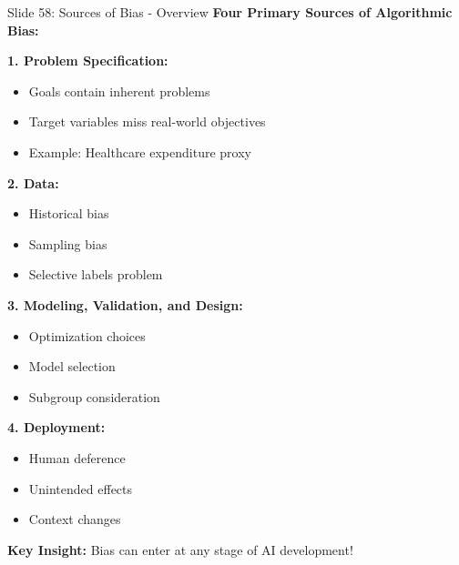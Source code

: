 \documentclass[8pt]{beamer}
\begin{document}
	\begin{frame}{Slide 58: Sources of Bias - Overview}
		\fontsize{6.5}{7.5}\selectfont
		\textbf{Four Primary Sources of Algorithmic Bias:}
		
		\vspace{0.1cm}
		\textbf{1. Problem Specification:}
		\begin{itemize}
			\item Goals contain inherent problems
			\item Target variables miss real-world objectives
			\item Example: Healthcare expenditure proxy
		\end{itemize}
		
		\vspace{0.1cm}
		\textbf{2. Data:}
		\begin{itemize}
			\item Historical bias
			\item Sampling bias
			\item Selective labels problem
		\end{itemize}
		
		\vspace{0.1cm}
		\textbf{3. Modeling, Validation, and Design:}
		\begin{itemize}
			\item Optimization choices
			\item Model selection
			\item Subgroup consideration
		\end{itemize}
		
		\vspace{0.1cm}
		\textbf{4. Deployment:}
		\begin{itemize}
			\item Human deference
			\item Unintended effects
			\item Context changes
		\end{itemize}
		
		\textcolor{myblue}{\textbf{Key Insight:}} Bias can enter at \textcolor{myblue}{any stage} of AI development!
	\end{frame}
	
\end{document}

